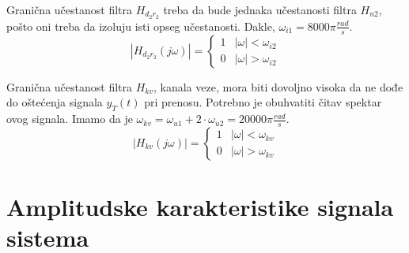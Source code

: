 \documentclass[titlepage,a4paper,12pt]{article}
\begin{document}
	\bigskip
	Granična učestanost filtra $H_{d_2r_2}$ treba da bude jednaka učestanosti filtra  $H_{n2}$, pošto oni treba da izoluju isti opseg učestanosti. Dakle, $\omega_{i1} = 8000\pi \frac{rad}{s}$. 
	\begin{equation}
		|H_{d_2r_2}(j\omega)| = \left\{
		\begin{array}{ll}
			1& |\omega| < \omega_{i2} \\
			0& |\omega| > \omega_{i2}
		\end{array}\right.
	\end{equation} 
	
	\bigskip
	Granična učestanost filtra $H_{kv}$, kanala veze, mora biti dovoljno visoka da ne dođe do oštećenja signala $y_T(t)$ pri prenosu. Potrebno je obuhvatiti čitav spektar ovog signala. Imamo da je $\omega_{kv} = \omega_{u1}+2\cdot\omega_{u2} = 20000\pi\frac{rad}{s}$.
	\begin{equation}
		|H_{kv}(j\omega)| = \left\{
		\begin{array}{ll}
			1& |\omega| < \omega_{kv} \\
			0& |\omega| > \omega_{kv}
		\end{array}\right.
	\end{equation} 
	
	\clearpage
	
	\section{Amplitudske karakteristike signala sistema}
\end{document}
